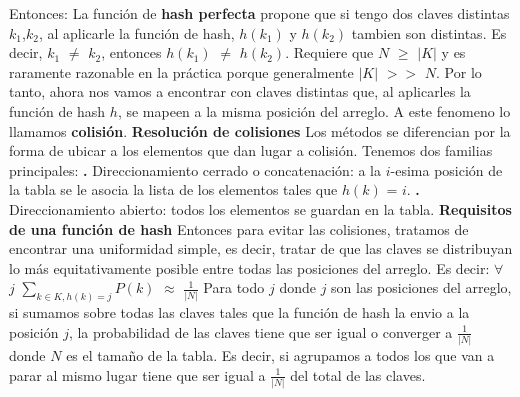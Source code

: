 \documentclass[10pt,a4paper]{article}
\begin{document}
Entonces:
\newline
\newline
La función de \textbf{hash perfecta} propone que si tengo dos claves distintas $k_{1}$,$k_{2}$, al aplicarle la función de hash, $h(k_{1})$ y $h(k_{2})$ tambien son distintas. Es decir, $k_{1}$ $\neq$ $k_{2}$, entonces $h(k_{1})$ $\neq$ $h(k_{2})$.
\newline
\newline
Requiere que $N$ $\geq$ $|$$K$$|$ y es raramente razonable en la práctica porque generalmente $|$$K$$|$ $>$$>$ $N$.
\newline
\newline
Por lo tanto, ahora nos vamos a encontrar con claves distintas que, al aplicarles la función de hash $h$, se mapeen a la misma posición del arreglo. A este fenomeno lo llamamos \textbf{colisión}. 
\newline
\newline
\textbf{Resolución de colisiones}
\newline
\newline
Los métodos se diferencian por la forma de ubicar a los elementos que dan lugar a colisión. Tenemos dos familias principales:
\newline
\newline
\textbf{.} Direccionamiento cerrado o concatenación: a la $i$-esima posición de la tabla se le asocia la lista de los elementos tales que $h(k)$ = $i$.
\newline
\newline
\textbf{.} Direccionamiento abierto: todos los elementos se guardan en la tabla.
\newline
\newline
\textbf{Requisitos de una función de hash}
\newline
\newline
Entonces para evitar las colisiones, tratamos de encontrar una uniformidad simple, es decir, tratar de que las claves se distribuyan lo más equitativamente posible entre todas las posiciones del arreglo. Es decir:
\newline
\newline
$\forall$ $j$ $\displaystyle \sum_{k \in K, h(k)=j}^{}$$P(k)$ $\approx$ $\displaystyle \frac{1}{|N|}$
\newline
\newline
Para todo $j$ donde $j$ son las posiciones del arreglo, si sumamos sobre todas las claves tales que la función de hash la envio a la posición $j$, la probabilidad de las claves tiene que ser igual o converger a $\displaystyle \frac{1}{|N|}$ donde $N$ es el tamaño de la tabla. Es decir, si agrupamos a todos los que van a parar al mismo lugar tiene que ser igual a $\displaystyle \frac{1}{|N|}$ del total de las claves.    
\end{document}
